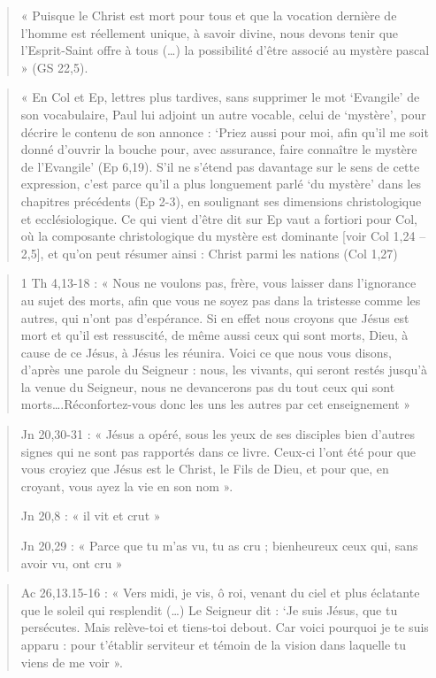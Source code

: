 \begin{quote}
    « Puisque le Christ est mort pour tous et que la vocation dernière de
l'homme est réellement unique, à savoir divine, nous devons tenir que
l'Esprit-Saint offre à tous (\ldots) la possibilité d'être associé au
mystère pascal » (GS 22,5).
\end{quote}

\begin{quote}
    « En Col et Ep, lettres plus tardives, sans supprimer le mot `Evangile'
de son vocabulaire, Paul lui adjoint un autre vocable, celui de
`mystère', pour décrire le contenu de son annonce : `Priez aussi pour
moi, afin qu'il me soit donné d'ouvrir la bouche pour, avec assurance,
faire connaître le mystère de l'Evangile' (Ep 6,19). S'il ne s'étend pas
davantage sur le sens de cette expression, c'est parce qu'il a plus
longuement parlé `du mystère' dans les chapitres précédents (Ep 2-3), en
soulignant ses dimensions christologique et ecclésiologique. Ce qui
vient d'être dit sur Ep vaut a fortiori pour Col, où la composante
christologique du mystère est
dominante {[}voir Col 1,24 -- 2,5{]}, et qu'on peut résumer ainsi :
Christ parmi les nations (Col 1,27) 
\end{quote}

\begin{quote}
   1 Th 4,13-18 : « Nous ne voulons pas, frère, vous laisser dans
l'ignorance au sujet des morts, afin que vous ne soyez pas dans la
tristesse comme les autres, qui n'ont pas d'espérance. Si en effet nous
croyons que Jésus est mort et qu'il est ressuscité, de même aussi ceux
qui sont morts, Dieu, à cause de ce Jésus, à Jésus les réunira. Voici ce
que nous vous disons, d'après une parole du Seigneur : nous, les
vivants, qui seront restés jusqu'à la venue du Seigneur, nous ne
devancerons pas du tout ceux qui sont morts\ldots.Réconfortez-vous donc
les uns les autres par cet enseignement » 
\end{quote}

\begin{quote}
    Jn 20,30-31 : « Jésus a opéré, sous les yeux de ses disciples bien
d'autres signes qui ne sont pas rapportés dans ce livre. Ceux-ci l'ont
été pour que vous croyiez que Jésus est le Christ, le Fils de Dieu, et
pour que, en croyant, vous ayez la vie en son nom ».

Jn 20,8 : « il vit et crut »

Jn 20,29 : « Parce que tu m'as vu, tu as cru ; bienheureux ceux qui,
sans avoir vu, ont cru »
\end{quote}



\begin{quote}
   Ac 26,13.15-16 : « Vers midi, je vis, ô roi, venant du ciel et plus
éclatante que le soleil qui resplendit (\ldots) Le Seigneur dit : `Je
suis Jésus, que tu persécutes. Mais relève-toi et tiens-toi debout. Car
voici pourquoi je te suis apparu : pour t'établir serviteur et témoin de
la vision dans laquelle tu viens de me voir ». 
\end{quote}




